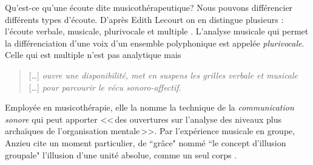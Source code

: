    
Qu'est-ce qu'une écoute dite musicothérapeutique?
Nous pouvons  différencier différents types d'écoute. D'après Edith Lecourt
on en distingue plusieurs : l'écoute verbale, musicale, plurivocale et multiple
\autocite[182]{lecourt:decouvrir}.
 L'analyse musicale qui permet la différenciation d'une voix d'un ensemble polyphonique est appelée \emph{plurivocale}. Celle qui est multiple n'est pas analytique  mais
 \begin{quote}
 	 [\ldots] \textit{ouvre une disponibilité, met en suspens les grilles verbale et musicale} [\ldots] \emph{pour parcourir le vécu sonoro-affectif}\autocite[183]{lecourt:decouvrir}.
 \end{quote}
 Employée en musicothérapie, elle la nomme la technique de la  \emph{communication sonore} qui peut apporter
 <<\,des ouvertures sur l'analyse des niveaux plus archaïques de l'organisation mentale\,>>\autocite[154]{lecourt:decouvrir}.
 Par l'expérience musicale en groupe, Anzieu cite un moment
 particulier, de ``grâce"  nommé ``le concept d'illusion groupale"
 l'illusion d'une unité absolue, comme un seul corps \autocite[113]{AnzieuMoiPeau}.




